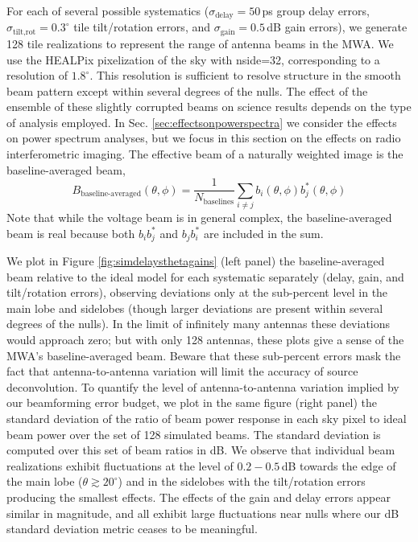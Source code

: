 For each of several possible systematics ($\sigma_\text{delay}=50$\,ps group delay errors, $\sigma_\text{tilt,rot}=0.3^\circ$ tile tilt/rotation errors, and $\sigma_\text{gain}=0.5$\,dB gain errors), we generate 128 tile realizations to represent the range of antenna beams in the MWA. We use the HEALPix pixelization of the sky \citep{healpix} with nside=32, corresponding to a resolution of $1.8^\circ$. This resolution is sufficient to resolve structure in the smooth beam pattern except within several degrees of the nulls. The effect of the ensemble of these slightly corrupted beams on science results depends on the type of analysis employed. In Sec. \ref{sec:effectsonpowerspectra} we consider the effects on power spectrum analyses, but we focus in this section on the effects on radio interferometric imaging. The effective beam of a naturally weighted image is the baseline-averaged beam, 
\begin{equation}
\label{eqn:meanbaselinebeam}
B_\text{baseline-averaged}(\theta,\phi)=\frac{1}{N_\text{baselines}}\sum_{i\ne j} b_i(\theta,\phi)b_j^*(\theta,\phi)
\end{equation}
Note that while the voltage beam is in general complex, the baseline-averaged beam is real because both $b_ib_j^*$ and $b_jb_i^*$ are included in the sum.

We plot in Figure \ref{fig:simdelaysthetagains} (left panel) the baseline-averaged beam relative to the ideal model for each systematic separately (delay, gain, and tilt/rotation errors), observing deviations only at the sub-percent level in the main lobe and sidelobes (though larger deviations are present within several degrees of the nulls). In the limit of infinitely many antennas these deviations would approach zero; but with only 128 antennas, these plots give a sense of the MWA's baseline-averaged beam. Beware that these sub-percent errors mask the fact that antenna-to-antenna variation will limit the accuracy of source deconvolution. To quantify the level of antenna-to-antenna variation implied by our beamforming error budget, we plot in the same figure (right panel) the standard deviation of the ratio of beam power response in each sky pixel to ideal beam power over the set of 128 simulated beams. The standard deviation is computed over this set of beam ratios in dB. We observe that individual beam realizations exhibit fluctuations at the level of $0.2-0.5$\,dB towards the edge of the main lobe ($\theta\gtrsim20^\circ$) and in the sidelobes with the tilt/rotation errors producing the smallest effects. The effects of the gain and delay errors appear similar in magnitude, and all exhibit large fluctuations near nulls where our dB standard deviation metric ceases to be meaningful.

